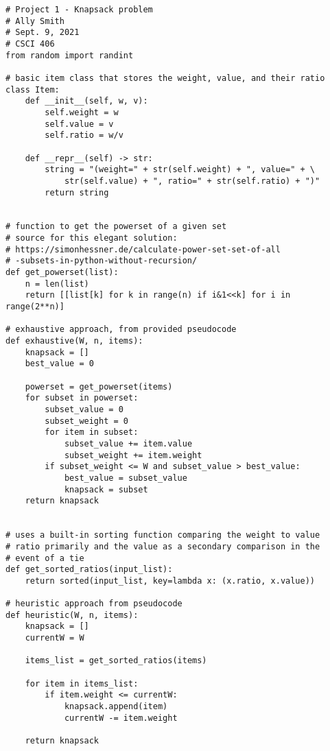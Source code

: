 \documentclass[12pt]{article}
\begin{document}
\begin{verbatim}
# Project 1 - Knapsack problem
# Ally Smith
# Sept. 9, 2021
# CSCI 406
from random import randint

# basic item class that stores the weight, value, and their ratio
class Item:
    def __init__(self, w, v):
        self.weight = w
        self.value = v
        self.ratio = w/v

    def __repr__(self) -> str:
        string = "(weight=" + str(self.weight) + ", value=" + \
            str(self.value) + ", ratio=" + str(self.ratio) + ")"
        return string


# function to get the powerset of a given set 
# source for this elegant solution:
# https://simonhessner.de/calculate-power-set-set-of-all
# -subsets-in-python-without-recursion/
def get_powerset(list):
    n = len(list)
    return [[list[k] for k in range(n) if i&1<<k] for i in range(2**n)]

# exhaustive approach, from provided pseudocode
def exhaustive(W, n, items):
    knapsack = []
    best_value = 0
    
    powerset = get_powerset(items)
    for subset in powerset:
        subset_value = 0
        subset_weight = 0
        for item in subset:
            subset_value += item.value
            subset_weight += item.weight
        if subset_weight <= W and subset_value > best_value:
            best_value = subset_value
            knapsack = subset
    return knapsack


# uses a built-in sorting function comparing the weight to value
# ratio primarily and the value as a secondary comparison in the
# event of a tie
def get_sorted_ratios(input_list):
    return sorted(input_list, key=lambda x: (x.ratio, x.value))

# heuristic approach from pseudocode
def heuristic(W, n, items):
    knapsack = []
    currentW = W

    items_list = get_sorted_ratios(items)

    for item in items_list:
        if item.weight <= currentW:
            knapsack.append(item)
            currentW -= item.weight

    return knapsack
\end{verbatim}
\end{document}
